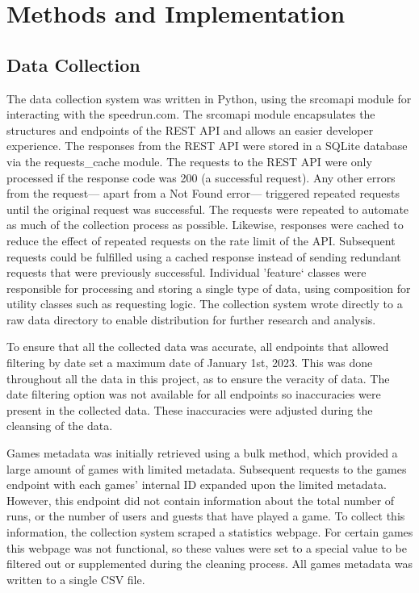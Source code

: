 \section{Methods and Implementation}

\subsection{Data Collection}

The data collection system was written in Python, using the srcomapi \cite{srcomapi} module for interacting with the speedrun.com. The srcomapi module encapsulates the structures and endpoints of the REST API and allows an easier developer experience. The responses from the REST API were stored in a SQLite database via the requests\_cache \cite{requests_cache} module. The requests to the REST API were only processed if the response code was 200 (a successful request). Any other errors from the request— apart from a Not Found error— triggered repeated requests until the original request was successful. The requests were repeated to automate as much of the collection process as possible. Likewise, responses were cached to reduce the effect of repeated requests on the rate limit of the API. Subsequent requests could be fulfilled using a cached response instead of sending redundant requests that were previously successful. Individual 'feature` classes were responsible for processing and storing a single type of data, using composition for utility classes such as requesting logic. The collection system wrote directly to a raw data directory to enable distribution for further research and analysis. 


To ensure that all the collected data was accurate, all endpoints that allowed filtering by date set a maximum date of January 1st, 2023. This was done throughout all the data in this project, as to ensure the veracity of data. The date filtering option was not available for all endpoints so inaccuracies were present in the collected data. These inaccuracies were adjusted during the cleansing of the data. 


Games metadata was initially retrieved using a bulk method, which provided a large amount of games with limited metadata. Subsequent requests to the games endpoint with each games' internal ID expanded upon the limited metadata. However, this endpoint did not contain information about the total number of runs, or the number of users and guests that have played a game. To collect this information, the collection system scraped a statistics webpage. For certain games this webpage was not functional, so these values were set to a special value to be filtered out or supplemented during the cleaning process. All games metadata was written to a single CSV file.


